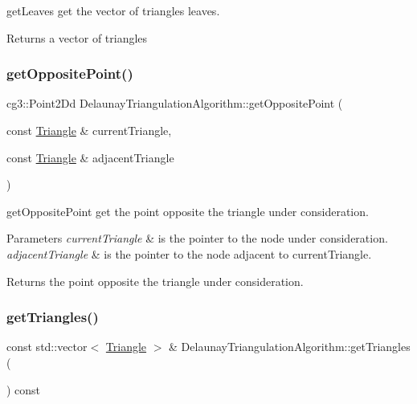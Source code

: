 get\+Leaves get the vector of triangles leaves. 

\begin{DoxyReturn}{Returns}
a vector of triangles 
\end{DoxyReturn}
\mbox{\label{classDelaunayTriangulationAlgorithm_aa0aba43587d1e0bf1857594323c1ef2c}} 
\subsubsection{\texorpdfstring{get\+Opposite\+Point()}{getOppositePoint()}}
{\footnotesize\ttfamily cg3\+::\+Point2\+Dd Delaunay\+Triangulation\+Algorithm\+::get\+Opposite\+Point (\begin{DoxyParamCaption}\item[{const \hyperlink{classTriangle}{Triangle} \&}]{current\+Triangle,  }\item[{const \hyperlink{classTriangle}{Triangle} \&}]{adjacent\+Triangle }\end{DoxyParamCaption})}



get\+Opposite\+Point get the point opposite the triangle under consideration. 


\begin{DoxyParams}{Parameters}
{\em current\+Triangle} & is the pointer to the node under consideration. \\
\hline
{\em adjacent\+Triangle} & is the pointer to the node adjacent to current\+Triangle. \\
\hline
\end{DoxyParams}
\begin{DoxyReturn}{Returns}
the point opposite the triangle under consideration. 
\end{DoxyReturn}
\mbox{\label{classDelaunayTriangulationAlgorithm_a56fe3edcfae8b23e2853bfb94ec87382}} 
\subsubsection{\texorpdfstring{get\+Triangles()}{getTriangles()}}
{\footnotesize\ttfamily const std\+::vector$<$ \hyperlink{classTriangle}{Triangle} $>$ \& Delaunay\+Triangulation\+Algorithm\+::get\+Triangles (\begin{DoxyParamCaption}{ }\end{DoxyParamCaption}) const\hspace{0.3cm}{\ttfamily [inline]}}



